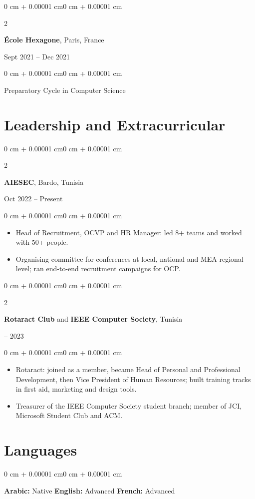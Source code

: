 \documentclass[10pt, letterpaper]{article}
\newenvironment{highlights}{
    \begin{itemize}[
        topsep=0.10 cm,
        parsep=0.10 cm,
        partopsep=0pt,
        itemsep=0pt,
        leftmargin=0 cm + 10pt
    ]
}{
    \end{itemize}
}
\newenvironment{onecolentry}{
    \begin{adjustwidth}{0 cm + 0.00001 cm}{0 cm + 0.00001 cm}
}{
    \end{adjustwidth}
}
\newenvironment{twocolentry}[2][]{
    \onecolentry
    \def\secondColumn{#2}
    \setcolumnwidth{\fill, 4.5 cm}
    \begin{paracol}{2}
}{
    \switchcolumn \raggedleft \secondColumn
    \end{paracol}
    \endonecolentry
}
\begin{document}
\begin{twocolentry}{Sept 2021 -- Dec 2021}
    \textbf{École Hexagone}, Paris, France
\end{twocolentry}

\begin{onecolentry}
    Preparatory Cycle in Computer Science
\end{onecolentry}

\section{Leadership and Extracurricular}

\begin{twocolentry}{Oct 2022 -- Present}
    \textbf{AIESEC}, Bardo, Tunisia
\end{twocolentry}

\vspace{0.10 cm}

\begin{onecolentry}
    \begin{highlights}
        \item Head of Recruitment, OCVP and HR Manager: led 8+ teams and worked with 50+ people.
        \item Organising committee for conferences at local, national and MEA regional level;
              ran end-to-end recruitment campaigns for OCP.
    \end{highlights}
\end{onecolentry}

\vspace{0.15 cm}

\begin{twocolentry}{2020 -- 2023}
    \textbf{Rotaract Club} \textnormal{and} \textbf{IEEE Computer Society}, Tunisia
\end{twocolentry}

\vspace{0.10 cm}

\begin{onecolentry}
    \begin{highlights}
        \item Rotaract: joined as a member, became Head of Personal and Professional Development,
              then Vice President of Human Resources; built training tracks in first aid,
              marketing and design tools.
        \item Treasurer of the IEEE Computer Society student branch; member of JCI, Microsoft
              Student Club and ACM.
    \end{highlights}
\end{onecolentry}

\section{Languages}

\begin{onecolentry}
    \textbf{Arabic:} Native \quad \textbf{English:} Advanced \quad \textbf{French:} Advanced
\end{onecolentry}
\end{document}
